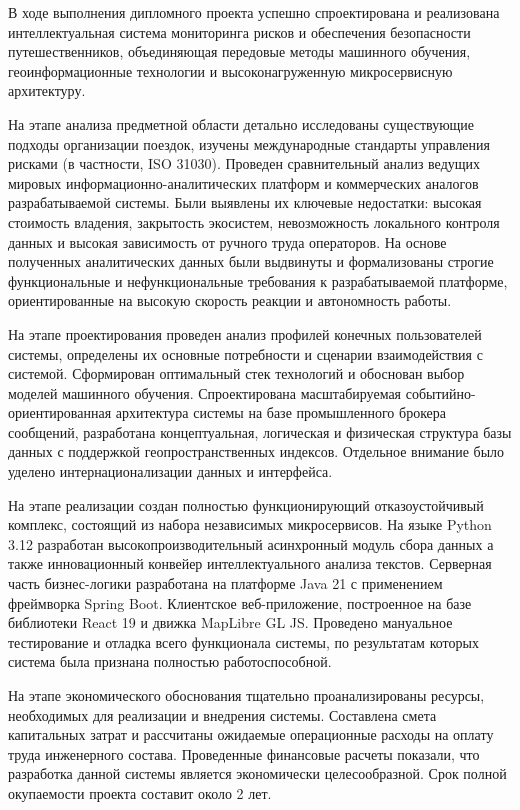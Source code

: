
В ходе выполнения дипломного проекта успешно спроектирована и реализована интеллектуальная система мониторинга рисков и обеспечения безопасности путешественников, объединяющая передовые методы машинного обучения, геоинформационные технологии и высоконагруженную микросервисную архитектуру.

На этапе анализа предметной области детально исследованы существующие подходы организации поездок, изучены международные стандарты управления рисками (в частности, ISO 31030). Проведен сравнительный анализ ведущих мировых информационно-аналитических платформ и коммерческих аналогов разрабатываемой системы. Были выявлены их ключевые недостатки: высокая стоимость владения, закрытость экосистем, невозможность локального контроля данных и высокая зависимость от ручного труда операторов. На основе полученных аналитических данных были выдвинуты и формализованы строгие функциональные и нефункциональные требования к разрабатываемой платформе, ориентированные на высокую скорость реакции и автономность работы.

На этапе проектирования проведен анализ профилей конечных пользователей системы, определены их основные потребности и сценарии взаимодействия с системой. Сформирован оптимальный стек технологий и обоснован выбор моделей машинного обучения. Спроектирована масштабируемая событийно-ориентированная архитектура системы на базе промышленного брокера сообщений, разработана концептуальная, логическая и физическая структура базы данных с поддержкой геопространственных индексов. Отдельное внимание было уделено интернационализации данных и интерфейса.

На этапе реализации создан полностью функционирующий отказоустойчивый комплекс, состоящий из набора независимых микросервисов. На языке Python 3.12 разработан высокопроизводительный асинхронный модуль сбора данных а также инновационный конвейер интеллектуального анализа текстов. Серверная часть бизнес-логики разработана на платформе Java 21 с применением фреймворка Spring Boot. Клиентское веб-приложение, построенное на базе библиотеки React 19 и движка MapLibre GL JS. Проведено мануальное тестирование и отладка всего функционала системы, по результатам которых система была признана полностью работоспособной.

На этапе экономического обоснования тщательно проанализированы ресурсы, необходимых для реализации и внедрения системы. Составлена смета капитальных затрат и рассчитаны ожидаемые операционные расходы на оплату труда инженерного состава. Проведенные финансовые расчеты показали, что разработка данной системы является экономически целесообразной. Срок полной окупаемости проекта составит около 2 лет.

